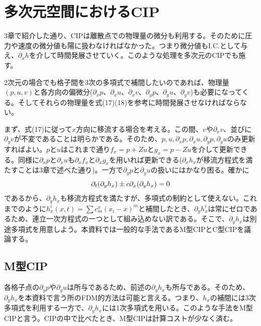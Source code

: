 \documentclass[dvipdfmx, 9pt, a4paper]{jsarticle}
\begin{document}
\section{多次元空間におけるCIP}
3章で紹介した通り、CIPは離散点での物理量の微分も利用する。そのために圧力や速度の微分値も陽に扱わなければなかった。つまり微分値もI.C.として与え、$\partial_xh$を介して時間発展させていく。このような処理を多次元のCIPでも施す。\par
2次元の場合でも格子間を3次の多項式で補間したいのであれば、物理量$(p, u, v)$と各方向の偏微分($\partial_xp$、$\partial_xu$、$\partial_xv$、$\partial_yp$、$\partial_yu$、$\partial_yv$)も必要になってくる。そしてそれらの物理量を式(17)(18)を参考に時間発展させなければならない。\par
まず、式(17)に従って$x$方向に移流する場合を考える。この間、$v$や$\partial_xv$、並びに$\partial_yv$が不変であることは明らかである。そのため、$p, u, \partial_xp, \partial_xu, \partial_yp, \partial_yu$のみ更新すればよい。$p$と$u$はこれまで通り$f_x=p+Zu$と$g_x=p-Zu$を介して更新できる。同様に$\partial_xp$と$\partial_xu$も$\partial_xf_x$と$\partial_xg_x$を用いれば更新できる($\partial_xh_x$が移流方程式を満たすことは3章で述べた通り)。一方で$\partial_yp$と$\partial_yu$の扱いにはかなり困る。確かに
\begin{equation}
\partial_t(\partial_yh_x)\pm c\partial_x(\partial_yh_x)=0 \notag
\end{equation}
であるから、$\partial_yh_x$も移流方程式を満たすが、多項式の制約として使えない。これまでのように$h^i_x(x, t)=\sum c^x_m(x_i-x)^m$と補間したとき、$\partial_yh^i_x$は常にゼロであるため、連立一次方程式の一つとして組み込めない訳である。そこで、$\partial_yh_x$は別途多項式を用意しよう。本資料では一般的な手法であるM型CIPとC型CIPを議論する。

\subsection{M型CIP}
各格子点の$\partial_yp$や$\partial_yu$は所与であるため、前述の$\partial_yh_x$も所与である。そのため、$\partial_yh_x$を本資料で言う所のFDM的方法は可能と言える。つまり、$h_x$の補間には3次多項式を利用する一方で、$\partial_yh_x$には1次多項式を用いる。このような手法をM型CIPと言う。CIPの中で比べたとき、M型CIPは計算コストが少なく済む。\par
\end{document}
